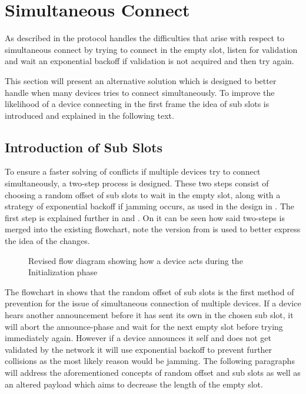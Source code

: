 \section{Simultaneous Connect}
As described in  the protocol handles the difficulties that arise with respect to simultaneous connect by trying to connect in the empty slot, listen for validation and wait an exponential backoff if validation is not acquired and then try again.

This section will present an alternative solution which is designed to better handle when many devices tries to connect simultaneously.
To improve the likelihood of a device connecting in the first frame the idea of sub slots is introduced and explained in the following text.

\subsection{Introduction of Sub Slots} %
\label{sub:introduction_of_sub_slots}
To ensure a faster solving of conflicts if multiple devices try to connect simultaneously, a two-step process is designed.
These two steps consist of choosing a random offset of sub slots to wait in the empty slot, along with a strategy of exponential backoff if jamming occurs, as used in the design in .
The first step is explained further in   and  .
On  it can be seen how said two-steps is merged into the existing flowchart, note the version from  is used to better express the idea of the changes.%

\begin{figure}[p]
    \centering \footnotesize
    
    \caption{Revised flow diagram showing how a device acts during the Initialization phase}
    \label{fig:pseudo_flowMultiConnectimp}
\end{figure}

The flowchart in  shows that the random offset of sub slots is the first method of prevention for the issue of simultaneous connection of multiple devices.
If a device hears another announcement before it has sent its own in the chosen sub slot, it will abort the announce-phase and wait for the next empty slot before trying immediately again.
However if a device announces it self and does not get validated by the network it will use exponential backoff to prevent further collisions as the most likely reason would be jamming.
The following paragraphs will address the aforementioned concepts of random offset and sub slots as well as an altered payload which aims to decrease the length of the empty slot.

